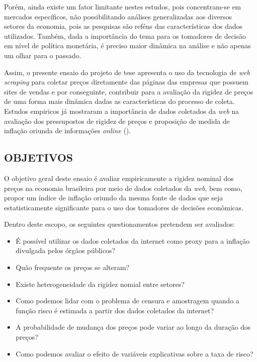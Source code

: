 \documentclass[twoside,a4paper,11pt]{report}
\begin{document}
Porém, ainda existe um fator limitante nestes estudos, pois concentram-se em mercados específicos, não possibilitando análises generalizadas aos diversos setores da economia, pois as pesquisas são reféns das características dos dados utilizados. Também, dada a importância do tema para os tomadores de decisão em nível de política monetária, é preciso maior dinâmica na análise e não apenas um olhar para o passado. 

Assim, o presente ensaio do projeto de tese apresenta o uso da tecnologia de \emph{web scraping} para coletar preços diretamente das páginas das empresas que possuem sites de vendas e por conseguinte, contribuir para a avaliação da rigidez de preços de uma forma mais dinâmica dadas as características do processo de coleta. Estudos empiricos já mostraram a importância de dados coletados da \emph{web} na avaliação dos pressupostos de rigidez de preços e proposição de medida de inflação oriunda de informações \emph{online} (\citet{cavallo2010scraped}).

\subsection*{OBJETIVOS}

O objetivo geral deste ensaio é avaliar empiricamente a rigidez nominal dos preços na economia brasileira por meio de dados coletados da \emph{web}, bem como, propor um índice de inflação oriundo da mesma fonte de dados que seja estatisticamente significante para o uso dos tomadores de decisões econômicas.

Dentro deste escopo, os seguintes questionamentos pretendem ser avaliados:

\begin{itemize}
  \item É possível utilizar os dados coletados da internet como proxy para a inflação divulgada pelos órgãos públicos?
  \item Quão frequente os preços se alteram?
  \item Existe heterogeneidade da rigidez nomial entre setores?
  \item Como podemos lidar com o problema de censura e amostragem quando a função risco é estimada a partir dos dados coletados da internet?
  \item A probabilidade de mudança dos preços pode variar ao longo da duração dos preços?
  \item Como podemos avaliar o efeito de variáveis explicativas sobre a taxa de risco?
\end{itemize}
\end{document}

